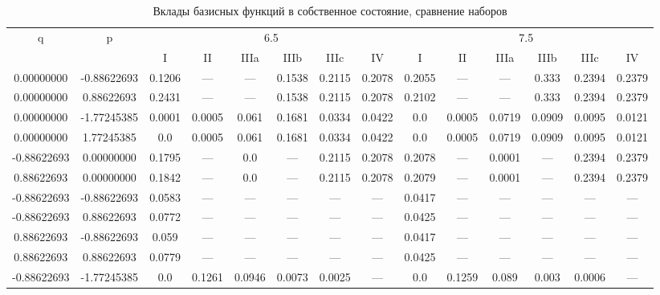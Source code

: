 \documentclass[a4paper,14pt]{extarticle}
\begin{document}
\begin{landscape}
\begin{table}[H]
\centering
\caption{Вклады базисных функций в собственное состояние, сравнение наборов}
\begin{tabular}{|c|c|*{6}{c}|*{6}{c}|}
\hline
\multirow{2}{*}{q} & \multirow{2}{*}{p} & \multicolumn{6}{|c|}{6.5}                           & \multicolumn{6}{|c|}{7.5}                           \\
\cline{3-14}
                   &                    & I      & II     & IIIa   & IIIb   & IIIc   & IV     & I      & II     & IIIa   & IIIb   & IIIc   & IV     \\ 
\hline
 0.00000000        & -0.88622693        & 0.1206 & ---    & ---    & 0.1538 & 0.2115 & 0.2078 & 0.2055 & ---    & ---    & 0.333  & 0.2394 & 0.2379 \\ 
 0.00000000        &  0.88622693        & 0.2431 & ---    & ---    & 0.1538 & 0.2115 & 0.2078 & 0.2102 & ---    & ---    & 0.333  & 0.2394 & 0.2379 \\
 0.00000000        & -1.77245385        & 0.0001 & 0.0005 & 0.061  & 0.1681 & 0.0334 & 0.0422 & 0.0    & 0.0005 & 0.0719 & 0.0909 & 0.0095 & 0.0121 \\
 0.00000000        &  1.77245385        & 0.0    & 0.0005 & 0.061  & 0.1681 & 0.0334 & 0.0422 & 0.0    & 0.0005 & 0.0719 & 0.0909 & 0.0095 & 0.0121 \\
-0.88622693        &  0.00000000        & 0.1795 & ---    & 0.0    & ---    & 0.2115 & 0.2078 & 0.2078 & ---    & 0.0001 & ---    & 0.2394 & 0.2379 \\
 0.88622693        &  0.00000000        & 0.1842 & ---    & 0.0    & ---    & 0.2115 & 0.2078 & 0.2079 & ---    & 0.0001 & ---    & 0.2394 & 0.2379 \\
-0.88622693        & -0.88622693        & 0.0583 & ---    & ---    & ---    & ---    & ---    & 0.0417 & ---    & ---    & ---    & ---    & ---    \\
-0.88622693        &  0.88622693        & 0.0772 & ---    & ---    & ---    & ---    & ---    & 0.0425 & ---    & ---    & ---    & ---    & ---    \\
 0.88622693        & -0.88622693        & 0.059  & ---    & ---    & ---    & ---    & ---    & 0.0417 & ---    & ---    & ---    & ---    & ---    \\
 0.88622693        &  0.88622693        & 0.0779 & ---    & ---    & ---    & ---    & ---    & 0.0425 & ---    & ---    & ---    & ---    & ---    \\
-0.88622693        & -1.77245385        & 0.0    & 0.1261 & 0.0946 & 0.0073 & 0.0025 & ---    & 0.0    & 0.1259 & 0.089  & 0.003  & 0.0006 & ---    \\

\end{tabular}
\end{table}
\end{landscape}
\end{document}
